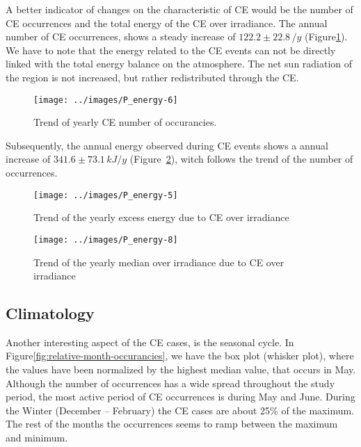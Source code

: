 \documentclass[
]{article}
\begin{document}
A better indicator of changes on the characteristic of CE would be the number of CE
occurrences and the total energy of the CE over irradiance. The annual number of CE
occurrences, shows a steady increase of
\(122.2\pm 22.8\,/y\)
(Figure\nobreakspace{}\ref{fig:P-energy-N}).
We have to note that the energy related to the CE events can not be directly linked
with the total energy balance on the atmosphere. The net sun radiation of the region
is not increased, but rather redistributed through the CE.

\begin{figure}[h!]

{\centering \texttt{[image: ../images/P\_energy-6]} 

}

\caption{Trend of yearly CE number of occurancies.}\label{fig:P-energy-N}
\end{figure}

Subsequently, the annual energy observed during CE events shows a annual increase of
\(341.6\pm 73.1\,kJ/y\)
(Figure~\ref{fig:P-energy-sum}), witch follows the trend of the number of
occurrences.

\begin{figure}[h!]

{\centering \texttt{[image: ../images/P\_energy-5]} 

}

\caption{Trend of the yearly excess energy due to CE over irradiance}\label{fig:P-energy-sum}
\end{figure}

\begin{figure}[h!]

{\centering \texttt{[image: ../images/P\_energy-8]} 

}

\caption{Trend of the yearly median over irradiance due to CE over irradiance}\label{fig:P-energy-median}
\end{figure}

\FloatBarrier

\hypertarget{climatology}{%
\subsection{Climatology}\label{climatology}}

Another interesting aspect of the CE cases, is the seasonal cycle. In
Figure\nobreakspace{}\ref{fig:relative-month-occurancies}, we have the box plot
(whisker plot), where the values have been normalized by the highest median value,
that occurs in May. Although the number of occurrences has a wide spread throughout
the study period, the most active period of CE occurrences is during May and June.
During the Winter (December -- February) the CE cases are about 25\% of the maximum.
The rest of the months the occurrences seems to ramp between the maximum and minimum.
\end{document}
